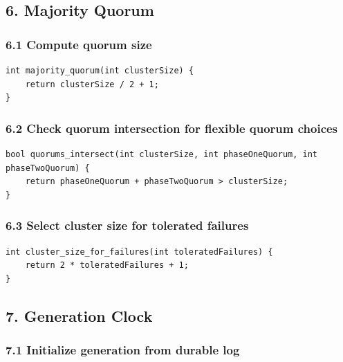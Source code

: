 \documentclass[10pt,letterpaper]{article}
\begin{document}
\subsection*{6. Majority Quorum}

\subsubsection*{6.1 Compute quorum size}

\begin{verbatim}
int majority_quorum(int clusterSize) {
    return clusterSize / 2 + 1;
}
\end{verbatim}

\subsubsection*{6.2 Check quorum intersection for flexible quorum choices}

\begin{verbatim}
bool quorums_intersect(int clusterSize, int phaseOneQuorum, int phaseTwoQuorum) {
    return phaseOneQuorum + phaseTwoQuorum > clusterSize;
}
\end{verbatim}

\subsubsection*{6.3 Select cluster size for tolerated failures}

\begin{verbatim}
int cluster_size_for_failures(int toleratedFailures) {
    return 2 * toleratedFailures + 1;
}
\end{verbatim}

\subsection*{7. Generation Clock}

\subsubsection*{7.1 Initialize generation from durable log}
\end{document}
